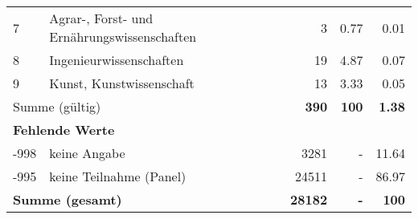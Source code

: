 \begin{longtable}{lXrrr}
     7 &
     \multicolumn{1}{X}{ Agrar-, Forst- und Ernährungswissenschaften   } &


       \num{3} &
       \num[round-mode=places,round-precision=2]{0,77} &
         \num[round-mode=places,round-precision=2]{0,01} \\

     8 &
     \multicolumn{1}{X}{ Ingenieurwissenschaften   } &


       \num{19} &
       \num[round-mode=places,round-precision=2]{4,87} &
         \num[round-mode=places,round-precision=2]{0,07} \\

     9 &
     \multicolumn{1}{X}{ Kunst, Kunstwissenschaft   } &


       \num{13} &
       \num[round-mode=places,round-precision=2]{3,33} &
         \num[round-mode=places,round-precision=2]{0,05} \\
     \midrule
     \multicolumn{2}{l}{Summe (gültig)} &
       \textbf{\num{390}} &
     \textbf{100} &
       \textbf{\num[round-mode=places,round-precision=2]{1,38}} \\
     \multicolumn{5}{l}{\textbf{Fehlende Werte}}\\
       -998 &
       keine Angabe &
         \num{3281} &
        - &
         \num[round-mode=places,round-precision=2]{11,64} \\
       -995 &
       keine Teilnahme (Panel) &
         \num{24511} &
        - &
         \num[round-mode=places,round-precision=2]{86,97} \\
     \midrule
     \multicolumn{2}{l}{\textbf{Summe (gesamt)}} &
          \textbf{\num{28182}} &
        \textbf{-} &
        \textbf{100} \\
     \bottomrule
     \end{longtable}
     
